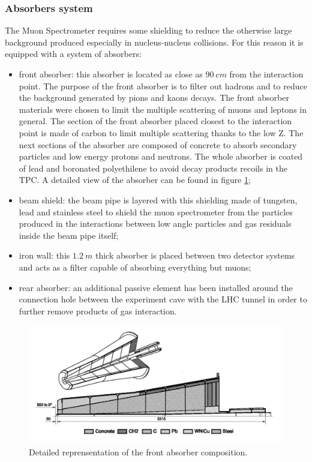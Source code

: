 \subsubsection{Absorbers system}
The Muon Spectrometer requires some shielding to reduce the otherwise large background produced especially in nucleus-nucleus collisions.
For this reason it is equipped with a system of absorbers:
\begin{itemize}
    \item front absorber: this absorber is located as close as $90\ cm$ from the interaction point. The purpose of the front absorber is to filter out hadrons and to reduce the background generated by pions and kaons decays. The front absorber materials were chosen to limit the multiple scattering of muons and leptons in general. The section of the front absorber placed closest to the interaction point is made of carbon to limit multiple scattering thanks to the low Z. The next sections of the absorber are composed of concrete to absorb secondary particles and low energy protons and neutrons. The whole absorber is coated of lead and boronated polyethilene to avoid decay products recoils in the TPC. A detailed view of the absorber can be found in figure \ref{fig:absorber};
    \item beam shield: the beam pipe is layered with this shielding made of tungsten, lead and stainless steel to shield the muon spectrometer from the particles produced in the interactions between low angle particles and gas residuals inside the beam pipe itself;
    \item iron wall: this $1.2\ m$ thick absorber is placed between two detector systems and acts as a filter capable of absorbing everything but muons;
    \item rear absorber: an additional passive element has been installed around the connection hole between the experiment cave with the LHC tunnel in order to further remove products of gas interaction.
\end{itemize}

\begin{figure}[!h]
\begin{center}
\includegraphics[width=0.7\linewidth]{Chapters/Introduction/Figs/absorber.pdf}
\caption{Detailed reprensentation of the front absorber composition.}
\label{fig:absorber}
\end{center}
\end{figure}

